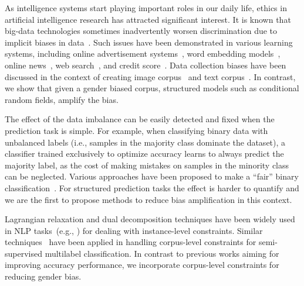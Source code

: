 As intelligence systems start playing important roles in our daily life, 
ethics in artificial intelligence research has attracted significant interest.
It is known that big-data technologies sometimes inadvertently worsen 
discrimination due to implicit biases in data~\cite{PPMHZ14}. 
Such issues have been demonstrated in various learning systems, including
online advertisement systems~\cite{sweeney2013discrimination}, word embedding
models~\cite{bolukbasi2016man,CBN17}, online news~\cite{ross2011women}, 
web search~\cite{kay2015unequal}, and credit score~\cite{hardt2016equality}.
Data collection biases have been discussed in the context of creating image corpus~\cite{misra2016seeing,van2016stereotyping} and text corpus~\cite{gordon2013reporting,van2010extracting}. In contrast, we show that given a gender biased corpus, structured models such as conditional random fields, amplify the bias. 

The effect of the data imbalance can be easily detected and fixed when the prediction task is simple. 
For example, when classifying binary data with unbalanced labels (i.e., samples in the majority class dominate the dataset), a classifier trained exclusively to optimize accuracy learns to always predict the majority label, as the cost of making mistakes on samples in the minority class can be neglected. 
Various approaches have been proposed to make a ``fair'' binary classification~\cite{barocas2014big,dwork2012fairness,feldman2015certifying,zliobaite2015survey}.
For structured prediction tasks the effect is harder to quantify and we are the first to propose methods to reduce bias amplification in this context. 

Lagrangian relaxation and dual decomposition techniques have been widely used in NLP tasks~(e.g., \cite{sontag2011introduction,Rush2012,chang2011exact,peng2015dual}) for dealing with instance-level constraints. Similar techniques~\cite{ChangSuKe13,dalvi2015constrained} have been applied in handling  corpus-level constraints for semi-supervised  multilabel classification. 
In contrast to previous works aiming for improving accuracy performance, we incorporate corpus-level constraints for reducing gender bias.  